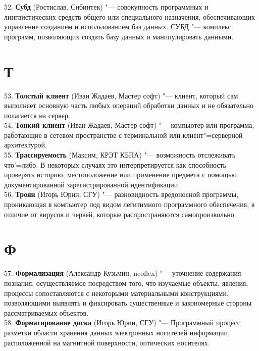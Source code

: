 \documentclass[14 pt]{extarticle}
\begin{document}
    52. \textbf{Субд} (Ростислав. Сибинтек) "--- совокупность программных и лингвистических средств общего или специального назначения, обеспечивающих управление созданием и использованием баз данных. СУБД "--- комплекс программ, позволяющих создать базу данных и манипулировать данными. \\
    
\section*{Т}
    53. \textbf{Толстый клиент} (Иван Жадаев, Мастер софт) "--- клиент, который сам выполняет основную часть любых операций обработки данных и не обязательно полагается на сервер. \\
    
    54. \textbf{Тонкий клиент} (Иван Жадаев, Мастер софт) "--- компьютер или программа, работающие в сетевом пространстве с терминальной или клиент"=серверной архитектурой. \\
    
    55. \textbf{Трассируемость} (Максим, КРЭТ КБПА) "--- возможность отслеживать что'=либо. В некоторых случаях это интерпретируется как способность проверять историю, местоположение или применение предмета с помощью документированной зарегистрированной идентификации. \\
    
    56. \textbf{Троян} (Игорь Юрин, СГУ) "--- разновидность вредоносной программы, проникающая в компьютер под видом легитимного программного обеспечения, в отличие от вирусов и червей, которые распространяются самопроизвольно. \\
    
\section*{Ф}
    57. \textbf{Формализация} (Александр Кузьмин, neoflex) "---  уточнение содержания познания, осуществляемое посредством того, что изучаемые объекты, явления, процессы сопоставляются с некоторыми материальными конструкциями, позволяющими выявлять и фиксировать существенные и закономерные стороны рассматриваемых объектов. \\
    
    58. \textbf{Форматирование диска} (Игорь Юрин, СГУ) "--- Программный процесс разметки области хранения данных электронных носителей информации, расположенной на магнитной поверхности, оптических носителях. \\
    
\end{document}
